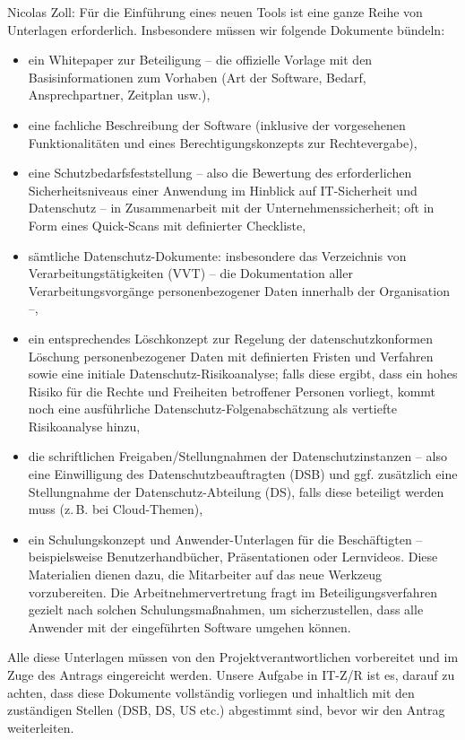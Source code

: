 \documentclass[
    12pt, 
    a4paper,
    ]{scrartcl} %
\begin{document}
Nicolas Zoll: Für die Einführung eines neuen Tools ist eine ganze Reihe von Unterlagen erforderlich. Insbesondere müssen wir folgende Dokumente bündeln:
\begin{itemize}
    \setlength\itemsep{0.4\baselineskip}
    \setlength\parskip{0pt}
    \setlength\parsep{0pt}
    \item \normalsize ein Whitepaper zur Beteiligung – die offizielle Vorlage mit den Basisinformationen zum Vorhaben (Art der Software, Bedarf, Ansprechpartner, Zeitplan usw.),
    \item \normalsize eine fachliche Beschreibung der Software (inklusive der vorgesehenen Funktionalitäten und eines Berechtigungskonzepts zur Rechtevergabe),
    \item \normalsize eine Schutzbedarfsfeststellung – also die Bewertung des erforderlichen Sicherheitsniveaus einer Anwendung im Hinblick auf IT-Sicherheit und Datenschutz – in Zusammenarbeit mit der Unternehmenssicherheit; oft in Form eines Quick-Scans mit definierter Checkliste,
    \item \normalsize sämtliche Datenschutz-Dokumente: insbesondere das Verzeichnis von Verarbeitungstätigkeiten (VVT) – die Dokumentation aller Verarbeitungsvorgänge personenbezogener Daten innerhalb der Organisation –, 
    \item \normalsize ein entsprechendes Löschkonzept zur Regelung der datenschutzkonformen Löschung personenbezogener Daten mit definierten Fristen und Verfahren sowie eine initiale Datenschutz-Risikoanalyse; falls diese ergibt, dass ein hohes Risiko für die Rechte und Freiheiten betroffener Personen vorliegt, kommt noch eine ausführliche Datenschutz-Folgenabschätzung als vertiefte Risikoanalyse hinzu,
    \item \normalsize die schriftlichen Freigaben/Stellungnahmen der Datenschutzinstanzen – also eine Einwilligung des Datenschutzbeauftragten (DSB) und ggf. zusätzlich eine Stellungnahme der Datenschutz-Abteilung (DS), falls diese beteiligt werden muss (z. B. bei Cloud-Themen),
    \item \normalsize ein Schulungskonzept und Anwender-Unterlagen für die Beschäftigten – beispielsweise Benutzerhandbücher, Präsentationen oder Lernvideos. Diese Materialien dienen dazu, die Mitarbeiter auf das neue Werkzeug vorzubereiten. Die Arbeitnehmervertretung fragt im Beteiligungsverfahren gezielt nach solchen Schulungsmaßnahmen, um sicherzustellen, dass alle Anwender mit der eingeführten Software umgehen können.
\end{itemize}
Alle diese Unterlagen müssen von den Projektverantwortlichen vorbereitet und im Zuge des Antrags eingereicht werden. Unsere Aufgabe in IT-Z/R ist es, darauf zu achten, dass diese Dokumente vollständig vorliegen und inhaltlich mit den zuständigen Stellen (DSB, DS, US etc.) abgestimmt sind, bevor wir den Antrag weiterleiten.
\end{document}
